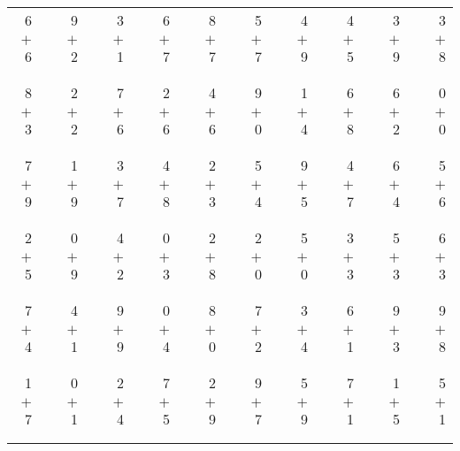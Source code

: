 \documentclass[12pt, letterpaper]{article}
\begin{document}
\begin{tabular}{rrrrrrrrrrrrrrrrrrr}
6 & & 9 & & 3 & & 6 & & 8 & & 5 & & 4 & & 4 & & 3 & & 3\\
$+$ 6 & & $+$ 2 & & $+$ 1 & & $+$ 7 & & $+$ 7 & & $+$ 7 & & $+$ 9 & & $+$ 5 & & $+$ 9 & & $+$ 8\\
\cline{1-1} \cline{3-3} \cline{5-5} \cline{7-7} \cline{9-9} \cline{11-11} \cline{13-13} \cline{15-15} \cline{17-17} \cline{19-19} \\ \\
8 & & 2 & & 7 & & 2 & & 4 & & 9 & & 1 & & 6 & & 6 & & 0\\
$+$ 3 & & $+$ 2 & & $+$ 6 & & $+$ 6 & & $+$ 6 & & $+$ 0 & & $+$ 4 & & $+$ 8 & & $+$ 2 & & $+$ 0\\
\cline{1-1} \cline{3-3} \cline{5-5} \cline{7-7} \cline{9-9} \cline{11-11} \cline{13-13} \cline{15-15} \cline{17-17} \cline{19-19} \\ \\
7 & & 1 & & 3 & & 4 & & 2 & & 5 & & 9 & & 4 & & 6 & & 5\\
$+$ 9 & & $+$ 9 & & $+$ 7 & & $+$ 8 & & $+$ 3 & & $+$ 4 & & $+$ 5 & & $+$ 7 & & $+$ 4 & & $+$ 6\\
\cline{1-1} \cline{3-3} \cline{5-5} \cline{7-7} \cline{9-9} \cline{11-11} \cline{13-13} \cline{15-15} \cline{17-17} \cline{19-19} \\ \\
2 & & 0 & & 4 & & 0 & & 2 & & 2 & & 5 & & 3 & & 5 & & 6\\
$+$ 5 & & $+$ 9 & & $+$ 2 & & $+$ 3 & & $+$ 8 & & $+$ 0 & & $+$ 0 & & $+$ 3 & & $+$ 3 & & $+$ 3\\
\cline{1-1} \cline{3-3} \cline{5-5} \cline{7-7} \cline{9-9} \cline{11-11} \cline{13-13} \cline{15-15} \cline{17-17} \cline{19-19} \\ \\
7 & & 4 & & 9 & & 0 & & 8 & & 7 & & 3 & & 6 & & 9 & & 9\\
$+$ 4 & & $+$ 1 & & $+$ 9 & & $+$ 4 & & $+$ 0 & & $+$ 2 & & $+$ 4 & & $+$ 1 & & $+$ 3 & & $+$ 8\\
\cline{1-1} \cline{3-3} \cline{5-5} \cline{7-7} \cline{9-9} \cline{11-11} \cline{13-13} \cline{15-15} \cline{17-17} \cline{19-19} \\ \\
1 & & 0 & & 2 & & 7 & & 2 & & 9 & & 5 & & 7 & & 1 & & 5\\
$+$ 7 & & $+$ 1 & & $+$ 4 & & $+$ 5 & & $+$ 9 & & $+$ 7 & & $+$ 9 & & $+$ 1 & & $+$ 5 & & $+$ 1\\
\cline{1-1} \cline{3-3} \cline{5-5} \cline{7-7} \cline{9-9} \cline{11-11} \cline{13-13} \cline{15-15} \cline{17-17} \cline{19-19} \\ \\

\end{tabular}
\end{document}
